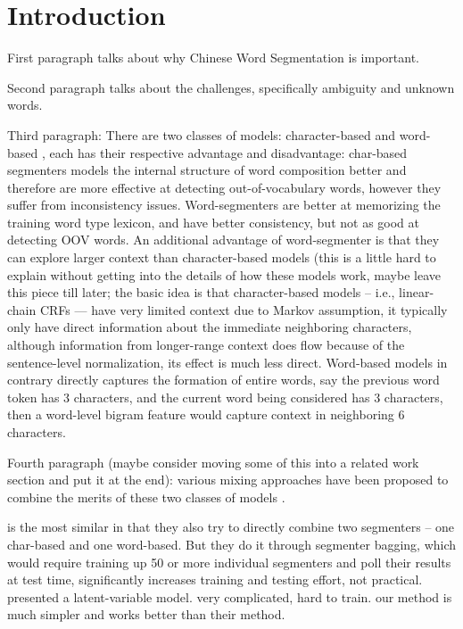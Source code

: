 \section{Introduction}

First paragraph talks about why Chinese Word Segmentation is important.

Second paragraph talks about the challenges, specifically ambiguity and unknown words.

Third paragraph: There are two classes of models: character-based \cite{Xue:2003:IJCLCLP,Tseng:2005:SIGHAN,Zhang:2006:HLT-NAACL,Wang:2010:COLING} and word-based \cite{Andrew:2006:EMNLP,Zhang:2007:ACL}, each has their respective advantage and disadvantage: char-based segmenters models the internal structure of word composition better and therefore are more effective at detecting out-of-vocabulary words, however they suffer from inconsistency issues. Word-segmenters are better at memorizing the training word type lexicon, and have better consistency, but not as good at detecting OOV words. An additional advantage of word-segmenter is that they can explore larger context than character-based models (this is a little hard to explain without getting into the details of how these models work, maybe leave this piece till later; the basic idea is that character-based models -- i.e., linear-chain CRFs --- have very limited context due to Markov assumption, it typically only have direct information about the immediate neighboring characters, although information from longer-range context does flow because of the sentence-level normalization, its effect is much less direct. Word-based models in contrary directly captures the formation of entire words, say the previous word token has 3 characters, and the current word being considered has 3 characters, then a word-level bigram feature would capture context in neighboring 6 characters. 

Fourth paragraph (maybe consider moving some of this into a related work section and put it at the end): various mixing approaches have been proposed to combine the merits of these two classes of models \cite{Wang:2006:SIGHAN,Lin:2009:CICLing,Sun:2009:HLT-NAACL,Sun:2010:COLING,Wang:2010:COLING}. 

\cite{Sun:2009:HLT-NAACL} is the most similar in that they also try to directly combine two segmenters -- one char-based and one word-based. But they do it through segmenter bagging, which would require training up 50 or more individual segmenters and poll their results at test time, significantly increases training and testing effort, not practical.
\cite{Sun:2009:HLT-NAACL} presented a latent-variable model. very complicated, hard to train. our method is much simpler and works better than their method.

